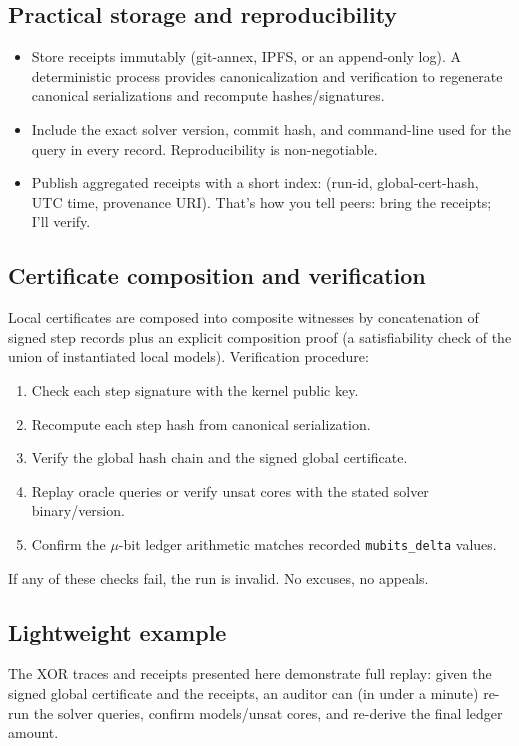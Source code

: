 \documentclass[11pt]{article}
\begin{document}
\subsection{Practical storage and reproducibility}
\begin{itemize}
  \item Store receipts immutably (git-annex, IPFS, or an append-only log). A deterministic process provides canonicalization and verification to regenerate canonical serializations and recompute hashes/signatures.
  \item Include the exact solver version, commit hash, and command-line used for the query in every record. Reproducibility is non-negotiable.
  \item Publish aggregated receipts with a short index: (run-id, global-cert-hash, UTC time, provenance URI). That’s how you tell peers: bring the receipts; I’ll verify.
\end{itemize}

\subsection{Certificate composition and verification}
Local certificates are composed into composite witnesses by concatenation of signed step records plus an explicit composition proof (a satisfiability check of the union of instantiated local models). Verification procedure:
\begin{enumerate}
  \item Check each step signature with the kernel public key.
  \item Recompute each step hash from canonical serialization.
  \item Verify the global hash chain and the signed global certificate.
  \item Replay oracle queries or verify unsat cores with the stated solver binary/version.
  \item Confirm the $\mu$-bit ledger arithmetic matches recorded \texttt{mubits\_delta} values.
  \end{enumerate}

If any of these checks fail, the run is invalid. No excuses, no appeals.

\subsection{Lightweight example}
The XOR traces and receipts presented here demonstrate full replay: given the signed global certificate and the receipts, an auditor can (in under a minute) re-run the solver queries, confirm models/unsat cores, and re-derive the final ledger amount.
\end{document}
